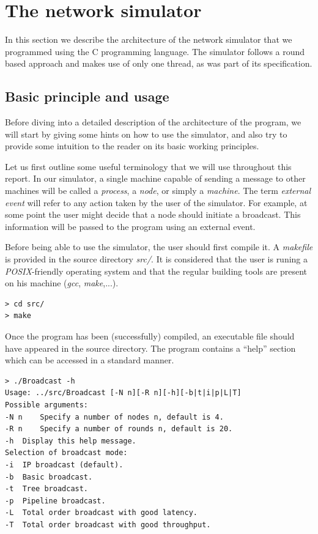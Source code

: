 \documentclass[a4paper]{article}
\begin{document}
\section{The network simulator}
In this section we describe the architecture of the network simulator that we
programmed using the C programming language. The simulator follows a round
based approach and makes use of only one thread, as was part of its
specification.

\subsection{Basic principle and usage}
Before diving into a detailed description of the architecture of the program,
we will start by giving some hints on how to use the simulator, and also try
to provide some intuition to the reader on its basic working principles.

Let us first outline some useful terminology that we will use throughout this
report. In our simulator, a single machine capable of sending a message to
other machines will be called a \textit{process}, a \textit{node}, or simply
a \textit{machine}. The term \textit{external event} will refer to any action
taken by the user of the simulator. For example, at some point the user might
decide that a node should initiate a broadcast. This information will be
passed to the program using an external event.

Before being able to use the simulator, the user should first compile it. A
\textit{makefile} is provided in the source directory \textit{src/}. It is
considered that the user is runing a \textit{POSIX}-friendly operating system
and that the regular building tools are present on his machine (\textit{gcc},
\textit{make},...).
\begin{lstlisting}
> cd src/
> make
\end{lstlisting}

Once the program has been (successfully) compiled, an executable file should
have appeared in the source directory. The program contains a ``help'' section
which can be accessed in a standard manner.
\begin{lstlisting}
> ./Broadcast -h
Usage: ../src/Broadcast [-N n][-R n][-h][-b|t|i|p|L|T]
Possible arguments:
-N n	Specify a number of nodes n, default is 4.
-R n	Specify a number of rounds n, default is 20.
-h	Display this help message.
Selection of broadcast mode:
-i	IP broadcast (default).
-b	Basic broadcast.
-t	Tree broadcast.
-p	Pipeline broadcast.
-L	Total order broadcast with good latency.
-T	Total order broadcast with good throughput.
\end{lstlisting}
\end{document}
